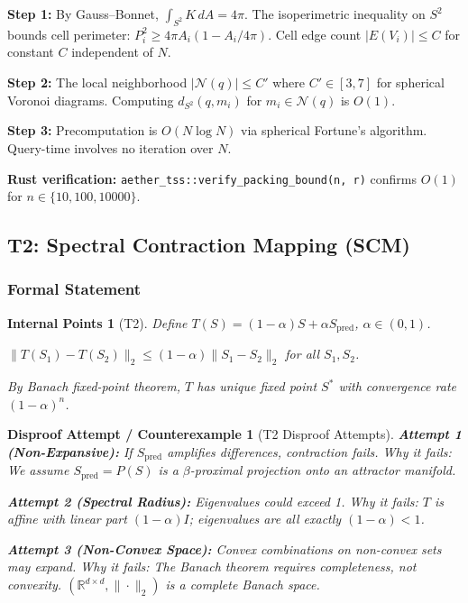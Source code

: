 \documentclass[11pt, a4paper]{article}
\theoremstyle{proofform}
\newtheorem{innerpoints}{Internal Points}
\numberwithin{innerpoints}{subsection}
\newtheorem{disproof}{Disproof Attempt / Counterexample}
\numberwithin{disproof}{subsection}
\theoremstyle{mathproof}
\begin{document}
\begin{Proof}
\textbf{Step 1:} By Gauss--Bonnet, $\int_{S^2} K \, dA = 4\pi$. The isoperimetric inequality on $S^2$ bounds cell perimeter: $P_i^2 \geq 4\pi A_i(1 - A_i/4\pi)$. Cell edge count $|E(V_i)| \leq C$ for constant $C$ independent of $N$.

\textbf{Step 2:} The local neighborhood $|\mathcal{N}(q)| \leq C'$ where $C' \in [3, 7]$ for spherical Voronoi diagrams. Computing $d_{S^2}(q, m_i)$ for $m_i \in \mathcal{N}(q)$ is $O(1)$.

\textbf{Step 3:} Precomputation is $O(N \log N)$ via spherical Fortune's algorithm. Query-time involves no iteration over $N$.

\textbf{Rust verification:} \texttt{aether\_tss::verify\_packing\_bound(n, r)} confirms $O(1)$ for $n \in \{10, 100, 10000\}$.
\end{Proof}

\subsection{T2: Spectral Contraction Mapping (SCM)}
\label{sec:scm}

\subsubsection*{Formal Statement}
\begin{innerpoints}[T2]
\item Define $T(S) = (1-\alpha)S + \alpha S_{\text{pred}}$, $\alpha \in (0,1)$.
\item $\|T(S_1) - T(S_2)\|_2 \leq (1-\alpha)\|S_1 - S_2\|_2$ for all $S_1, S_2$.
\item By Banach fixed-point theorem, $T$ has unique fixed point $S^*$ with convergence rate $(1-\alpha)^n$.
\end{innerpoints}

\begin{disproof}[T2 Disproof Attempts]
\textbf{Attempt 1 (Non-Expansive):} If $S_{\text{pred}}$ amplifies differences, contraction fails. \textit{Why it fails:} We assume $S_{\text{pred}} = P(S)$ is a $\beta$-proximal projection onto an attractor manifold.

\textbf{Attempt 2 (Spectral Radius):} Eigenvalues could exceed 1. \textit{Why it fails:} $T$ is affine with linear part $(1-\alpha)I$; eigenvalues are all exactly $(1-\alpha) < 1$.

\textbf{Attempt 3 (Non-Convex Space):} Convex combinations on non-convex sets may expand. \textit{Why it fails:} The Banach theorem requires completeness, not convexity. $(\mathbb{R}^{d \times d}, \|\cdot\|_2)$ is a complete Banach space.
\end{disproof}
\end{document}
